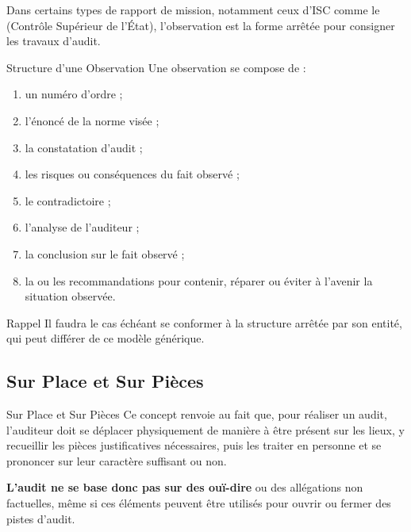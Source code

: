Dans certains types de rapport de mission, notamment ceux d'ISC comme le
 (Contrôle Supérieur de l'État), l'observation est la forme arrêtée
pour consigner les travaux d'audit.

\begin{boxdef}{Structure d'une Observation}
Une observation se compose de :
\begin{enumerate}
  \item un numéro d'ordre ;
  \item l'énoncé de la norme visée ;
  \item la constatation d'audit ;
  \item les risques ou conséquences du fait observé ;
  \item le contradictoire ;
  \item l'analyse de l'auditeur ;
  \item la conclusion sur le fait observé ;
  \item la ou les recommandations pour contenir, réparer ou éviter à l'avenir la
    situation observée.
\end{enumerate}
\end{boxdef}

\begin{boiteRemarque}{Rappel}
Il faudra le cas échéant se conformer à la structure arrêtée par son entité, qui peut
différer de ce modèle générique.
\end{boiteRemarque}

\subsection{Sur Place et Sur Pièces}

\begin{boxdef}{Sur Place et Sur Pièces}
Ce concept renvoie au fait que, pour réaliser un audit, l'auditeur doit se déplacer
physiquement de manière à être présent sur les lieux, y recueillir les pièces
justificatives nécessaires, puis les traiter en personne et se prononcer sur leur
caractère suffisant ou non.

\textbf{L'audit ne se base donc pas sur des ouï-dire} ou des allégations non factuelles,
même si ces éléments peuvent être utilisés pour ouvrir ou fermer des pistes d'audit.
\end{boxdef}

